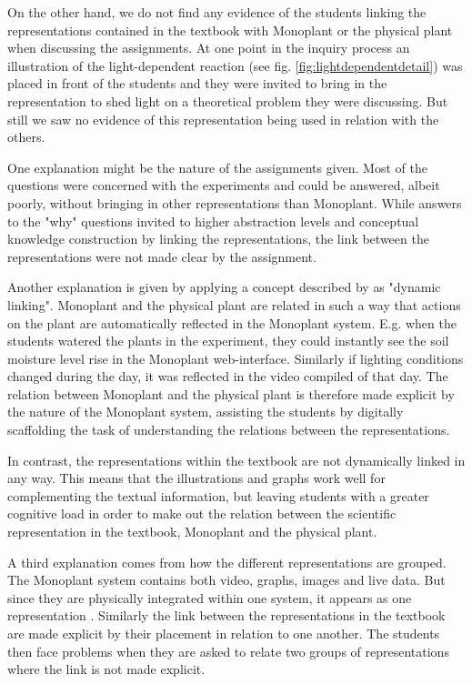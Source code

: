 On the other hand, we do not find any evidence of the students linking the representations contained in the textbook with Monoplant or the physical plant when discussing the assignments. At one point in the inquiry process an illustration of the light-dependent reaction (see fig. \ref{fig:lightdependentdetail}) was placed in front of the students and they were invited to bring in the representation to shed light on a theoretical problem they were discussing. But still we saw no evidence of this representation being used in relation with the others. 

One explanation might be the nature of the assignments given. Most of the questions were concerned with the experiments and could be answered, albeit poorly, without bringing in other representations than Monoplant. While answers to the "why" questions invited to higher abstraction levels and conceptual knowledge construction by linking the representations, the link between the representations were not made clear by the assignment. 

Another explanation is given by applying a concept described by \citet{van2006supporting} as "dynamic linking". Monoplant and the physical plant are related in such a way that actions on the plant are automatically reflected in the Monoplant system. E.g. when the students watered the plants in the experiment, they could instantly see the soil moisture level rise in the Monoplant web-interface. Similarly if lighting conditions changed during the day, it was reflected in the video compiled of that day. The relation between Monoplant and the physical plant is therefore made explicit by the nature of the Monoplant system, assisting the students by digitally scaffolding the task of understanding the relations between the representations. 

In contrast, the representations within the textbook are not dynamically linked in any way. This means that the illustrations and graphs work well for complementing the textual information, but leaving students with a greater cognitive load in order to make out the relation between the scientific representation in the textbook, Monoplant and the physical plant. 

A third explanation comes from how the different representations are grouped. The Monoplant system contains both video, graphs, images and live data. But since they are physically integrated within one system, it appears as one representation \citep{van2006supporting}. Similarly the link between the representations in the textbook are made explicit by their placement in relation to one another. The students then face problems when they are asked to relate two groups of representations where the link is not made explicit. 

